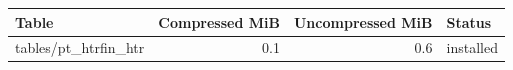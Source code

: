 {\small
\begin{tabular}{lrrl}
\hline
Table & Compressed MiB & Uncompressed MiB & Status \\
\hline
tables/pt\_htrfin\_htr & 0.1 & 0.6 & installed \\
\hline
\end{tabular}
}
